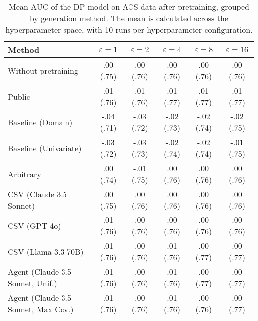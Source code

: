 \begin{table}[h!]
    \centering
    \caption{Mean AUC of the DP model on ACS data after pretraining, grouped by generation method. The mean is calculated across the hyperparameter space, with 10 runs per hyperparameter configuration.}
    \label{tab:epsilon_comparison}
    \begin{tabular}{lccccc}
    \toprule
    Method & $\varepsilon=1$ & $\varepsilon=2$ & $\varepsilon=4$ & $\varepsilon=8$ & $\varepsilon=16$ \\
    \midrule
    Without pretraining & .00 {\small (.75)} & .00 {\small (.76)} & .00 {\small (.76)} & .00 {\small (.76)} & .00 {\small (.76)} \\
    \arrayrulecolor{black!50!}\midrule
    Public & \cellcolor{gold!30}.01 {\small (.76)} & \cellcolor{gold!30}.01 {\small (.76)} & \cellcolor{gold!30}.01 {\small (.77)} & \cellcolor{gold!30}.01 {\small (.77)} & \cellcolor{gold!30}.01 {\small (.77)} \\
    \arrayrulecolor{black!50!}\midrule
    Baseline (Domain) & -.04 {\small (.71)} & -.03 {\small (.72)} & -.02 {\small (.73)} & -.02 {\small (.74)} & -.02 {\small (.75)} \\
    Baseline (Univariate) & -.03 {\small (.72)} & -.03 {\small (.73)} & -.02 {\small (.74)} & -.02 {\small (.74)} & -.01 {\small (.75)} \\
    \arrayrulecolor{black!50!}\midrule
    Arbitrary & .00 {\small (.74)} & -.01 {\small (.75)} & .00 {\small (.76)} & .00 {\small (.76)} & .00 {\small (.76)} \\
    \arrayrulecolor{black!50!}\midrule
    CSV (Claude 3.5 Sonnet) & .00 {\small (.75)} & .00 {\small (.76)} & .00 {\small (.76)} & .00 {\small (.76)} & .00 {\small (.76)} \\
    CSV (GPT-4o) & .01 {\small (.76)} & .00 {\small (.76)} & .00 {\small (.76)} & .00 {\small (.76)} & .00 {\small (.76)} \\
    CSV (Llama 3.3 70B) & \cellcolor{bronze!30}.01 {\small (.76)} & \cellcolor{silver!30}.00 {\small (.76)} & \cellcolor{silver!30}.01 {\small (.76)} & \cellcolor{silver!30}.00 {\small (.77)} & \cellcolor{silver!30}.00 {\small (.77)} \\
    \arrayrulecolor{black!50!}\midrule
    Agent (Claude 3.5 Sonnet, Unif.) & \cellcolor{silver!30}.01 {\small (.76)} & \cellcolor{bronze!30}.00 {\small (.76)} & \cellcolor{silver!30}.01 {\small (.76)} & \cellcolor{bronze!30}.00 {\small (.77)} & \cellcolor{bronze!30}.00 {\small (.77)} \\
    Agent (Claude 3.5 Sonnet, Max Cov.) & \cellcolor{bronze!30}.01 {\small (.76)} & \cellcolor{silver!30}.00 {\small (.76)} & \cellcolor{bronze!30}.01 {\small (.76)} & .00 {\small (.76)} & .00 {\small (.77)} \\

\end{tabular}
\end{table}
